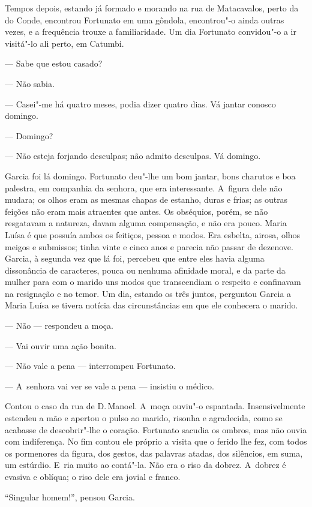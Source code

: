 \begin{linenumbers}
Tempos depois, estando já formado e morando na rua de Matacavalos, perto
da do Conde, encontrou Fortunato em uma gôndola, encontrou"-o ainda
outras vezes, e a frequência trouxe a familiaridade. Um dia Fortunato
convidou"-o a ir visitá"-lo ali perto, em Catumbi.

--- Sabe que estou casado?

--- Não sabia.

--- Casei"-me há quatro meses, podia dizer quatro dias. Vá jantar conosco
domingo.

--- Domingo?

--- Não esteja forjando desculpas; não admito desculpas. Vá domingo.

Garcia foi lá domingo. Fortunato deu"-lhe um bom jantar, bons charutos e
boa palestra, em companhia da senhora, que era interessante. A~figura
dele não mudara; os olhos eram as mesmas chapas de estanho, duras e
frias; as outras feições não eram mais atraentes que antes. Os
obséquios, porém, se não resgatavam a natureza, davam alguma
compensação, e não era pouco. Maria Luísa é que possuía ambos os
feitiços, pessoa e modos. Era esbelta, airosa, olhos meigos e submissos;
tinha vinte e cinco anos e parecia não passar de dezenove. Garcia, à
segunda vez que lá foi, percebeu que entre eles havia alguma dissonância
de caracteres, pouca ou nenhuma afinidade moral, e da parte da mulher
para com o marido uns modos que transcendiam o respeito e confinavam na
resignação e no temor. Um dia, estando os três juntos, perguntou Garcia
a Maria Luísa se tivera notícia das circunstâncias em que ele conhecera
o marido.

--- Não --- respondeu a moça.

--- Vai ouvir uma ação bonita.

--- Não vale a pena --- interrompeu Fortunato.

--- A~senhora vai ver se vale a pena --- insistiu o médico.

Contou o caso da rua de D.\,Manoel. A~moça ouviu"-o espantada.
Insensivelmente estendeu a mão e apertou o pulso ao marido, risonha e
agradecida, como se acabasse de descobrir"-lhe o coração. Fortunato
sacudia os ombros, mas não ouvia com indiferença. No fim contou ele
próprio a visita que o ferido lhe fez, com todos os pormenores da
figura, dos gestos, das palavras atadas, dos silêncios, em suma, um
estúrdio. E~ria muito ao contá"-la. Não era o riso da dobrez. A~dobrez é
evasiva e oblíqua; o riso dele era jovial e franco.

``Singular homem!'', pensou Garcia.


\end{linenumbers}
